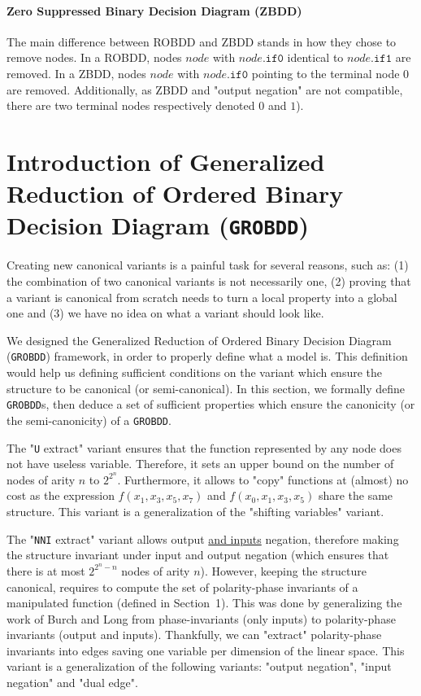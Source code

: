 \documentclass[a4paper,10pt]{article}
\newcommand{\uextract}{"\texttt{U} extract"}
\newcommand{\nniextract}{"\texttt{NNI} extract"}
\newcommand{\GroBdd}{\texttt{GROBDD}}
\newcommand{\fieldThen}{\mathtt{if1}}
\newcommand{\fieldElse}{\mathtt{if0}}
\begin{document}
\paragraph{Zero Suppressed Binary Decision Diagram (ZBDD)}
The main difference between ROBDD and ZBDD stands in how they chose to remove nodes.
In a ROBDD, nodes $node$ with $node.\fieldElse{}$ identical to $node.\fieldThen{}$ are removed.
In a ZBDD, nodes $node$ with $node.\fieldElse{}$ pointing to the terminal node $0$ are removed.
Additionally, as ZBDD and "output negation" are not compatible, there are two terminal nodes respectively denoted $0$ and $1$).

\section{Introduction of Generalized Reduction of Ordered Binary Decision Diagram (\GroBdd{})}

Creating new canonical variants is a painful task for several reasons, such as: (1) the combination of two canonical variants is not necessarily one, (2) proving that a variant is canonical from scratch needs to turn a local property into a global one and (3) we have no idea on what a variant should look like.

We designed the Generalized Reduction of Ordered Binary Decision Diagram (\GroBdd{}) framework, in order to properly define what a model is.
This definition would help us defining sufficient conditions on the variant which ensure the structure to be canonical (or semi-canonical).
In this section, we formally define \GroBdd{}s, then deduce a set of sufficient properties which ensure the canonicity (or the semi-canonicity) of a \GroBdd{}.

The \uextract{} variant ensures that the function represented by any node does not have useless variable.
Therefore, it sets an upper bound on the number of nodes of arity $n$ to $2^{2^n}$.
Furthermore, it allows to "copy" functions at (almost) no cost as the expression $f(x_1, x_3, x_5, x_7)$ and $f(x_0, x_1, x_3, x_5)$ share the same structure.
This variant is a generalization of the "shifting variables"\cite{MinatoVariants} variant.


The \nniextract{} variant allows output \underline{and inputs} negation, therefore making the structure invariant under input and output negation (which ensures that there is at most $2^{2^n-n}$ nodes of arity $n$).
However, keeping the structure canonical, requires to compute the set of polarity-phase invariants of a manipulated function (defined in Section~1).
This was done by generalizing the work of Burch and Long\cite{BurchLong1992} from phase-invariants (only inputs) to polarity-phase invariants (output and inputs).
Thankfully, we can "extract" polarity-phase invariants into edges saving one variable per dimension of the linear space.
This variant is a generalization of the following variants: "output negation"\cite{BryantVariantN}, "input negation"\cite{MinatoVariants} and "dual edge"\cite{RolfVariantDual}.
\end{document}
